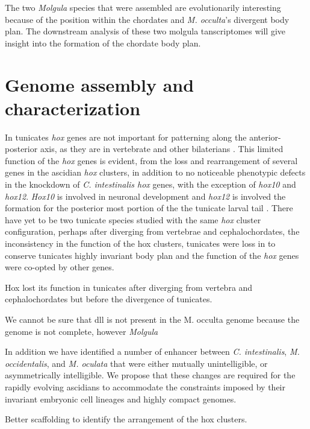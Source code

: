 The two \textit{Molgula} species that were assembled are evolutionarily interesting because of the position within the chordates and \textit{M. occulta}'s divergent body plan. The downstream analysis of these two molgula tanscriptomes will give insight into the formation of the chordate body plan. 

\section{Genome assembly and characterization}
In tunicates \textit{hox} genes are not important for patterning along the anterior-posterior axis, as they are in vertebrate and other bilaterians \cite{finnerty_origins_2003,mallo_regulation_2013,ikuta_limited_2010}. This limited function of the \textit{hox} genes is evident, from the loss and rearrangement of several genes in the ascidian \textit{hox} clusters, in addition to no noticeable phenotypic defects in the knockdown of \textit{C. intestinalis hox} genes, with the exception of \textit{hox10} and \textit{hox12}. \textit{Hox10} is involved in neuronal development and \textit{hox12} is involved the formation for the posterior most portion of the the tunicate larval tail \cite{ikuta_limited_2010}. There have yet to be two tunicate species studied with the same \textit{hox} cluster configuration, perhaps after diverging from vertebrae and cephalochordates, the inconsistency in the function of the hox clusters, tunicates were loss in to conserve tunicates highly invariant  body plan and the function of the \textit{hox} genes  were co-opted by other genes. %

Hox lost its function in tunicates after diverging from vertebra and cephalochordates but before the divergence of tunicates. 

We cannot be sure that dll is not present in the M. occulta genome because the genome is not complete, however  \textit{Molgula}

In addition we have identified a number of enhancer between \textit{C. intestinalis}, \textit{M. occidentalis}, and \textit{M. oculata} that were either mutually unintelligible, or asymmetrically intelligible. We propose that these changes are required for the rapidly evolving ascidians to accommodate the constraints imposed by their invariant embryonic cell lineages and highly compact genomes.

Better scaffolding to identify the arrangement of the hox clusters. 


